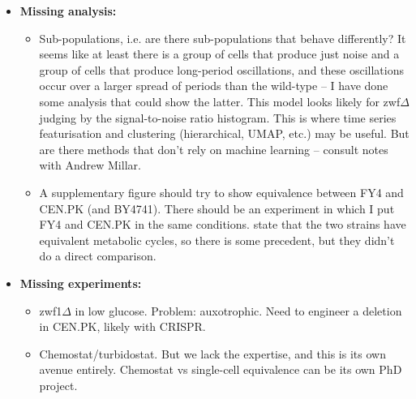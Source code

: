 \begin{itemize}
\item \textbf{Missing analysis:}
\begin{itemize}
\item Sub-populations, i.e. are there sub-populations that behave differently?  It seems like at least there is a group of cells that produce just noise and a group of cells that produce long-period oscillations, and these oscillations occur over a larger spread of periods than the wild-type -- I have done some analysis that could show the latter.  This model looks likely for zwf\(\Delta\) judging by the signal-to-noise ratio histogram.  This is where time series featurisation and clustering (hierarchical, UMAP, etc.) may be useful.  But are there methods that don't rely on machine learning -- consult notes with Andrew Millar.
\item A supplementary figure should try to show equivalence between FY4 and CEN.PK (and BY4741).  There should be an experiment in which I put FY4 and CEN.PK in the same conditions. \cite{baumgartnerFlavinbasedMetabolicCycles2018} state that the two strains have equivalent metabolic cycles, so there is some precedent, but they didn't do a direct comparison.
\end{itemize}
\item \textbf{Missing experiments:}
\begin{itemize}
\item zwf1\(\Delta\) in low glucose.  Problem: auxotrophic.  Need to engineer a deletion in CEN.PK, likely with CRISPR.
\item Chemostat/turbidostat.  But we lack the expertise, and this is its own avenue entirely.  Chemostat vs single-cell equivalence can be its own PhD project.
\end{itemize}
\end{itemize}


